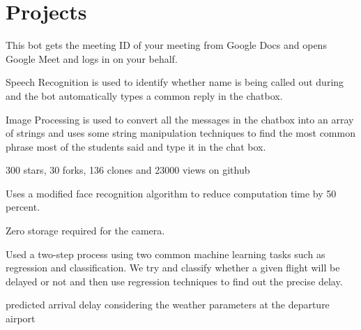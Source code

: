 \documentclass[]{deedy-resume-reversed}
\begin{document}
\begin{minipage}[t]{0.60\textwidth}
\section{Projects}
\begin{tightemize}
\item This bot gets the meeting ID of your meeting from Google Docs and opens Google Meet and logs in on your behalf.
\item Speech Recognition is used to identify whether name is being called out during  and the bot automatically types a common reply in the chatbox.
\item Image Processing is used to convert all the messages in the chatbox into an array of strings and uses some string manipulation techniques to find the most common phrase most of the students said and type it in the chat box.
\item 300 stars, 30 forks, 136 clones and 23000 views on github
\end{tightemize}
\sectionsep

\begin{tightemize}
\item  Uses a modified face recognition algorithm to reduce computation time by 50 percent.
\item  Zero storage required for the camera.

\end{tightemize}
\sectionsep


\begin{tightemize}
\item  Used a two-step process using two common machine learning tasks such as regression and classification. We try and classify whether a given flight will be delayed or not and then use regression techniques to find out the precise delay.
\item  predicted arrival delay considering the weather parameters at the departure airport

\end{tightemize}
\sectionsep



\end{minipage}
\end{document}
